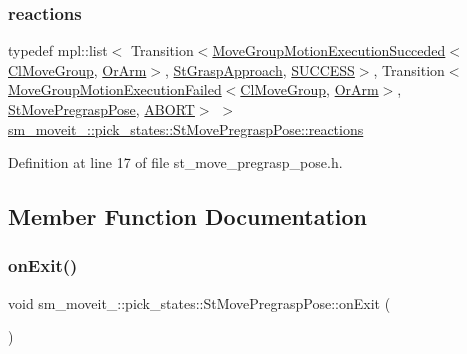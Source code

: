 \subsubsection{\texorpdfstring{reactions}{reactions}}
{\footnotesize\ttfamily typedef mpl\+::list$<$ Transition$<$\hyperlink{structmoveit__z__client_1_1MoveGroupMotionExecutionSucceded}{Move\+Group\+Motion\+Execution\+Succeded}$<$\hyperlink{classmoveit__z__client_1_1ClMoveGroup}{Cl\+Move\+Group}, \hyperlink{classsm__moveit__4_1_1OrArm}{Or\+Arm}$>$, \hyperlink{structsm__moveit__4_1_1pick__states_1_1StGraspApproach}{St\+Grasp\+Approach}, \hyperlink{classSUCCESS}{S\+U\+C\+C\+E\+SS}$>$, Transition$<$\hyperlink{structmoveit__z__client_1_1MoveGroupMotionExecutionFailed}{Move\+Group\+Motion\+Execution\+Failed}$<$\hyperlink{classmoveit__z__client_1_1ClMoveGroup}{Cl\+Move\+Group}, \hyperlink{classsm__moveit__4_1_1OrArm}{Or\+Arm}$>$, \hyperlink{structsm__moveit__4_1_1pick__states_1_1StMovePregraspPose}{St\+Move\+Pregrasp\+Pose}, \hyperlink{classABORT}{A\+B\+O\+RT}$>$ $>$ \hyperlink{structsm__moveit__4_1_1pick__states_1_1StMovePregraspPose_a4329bf7123b5978a7418bda57b17541d}{sm\+\_\+moveit\+\_\+::pick\+\_\+states\+::\+St\+Move\+Pregrasp\+Pose\+::reactions}}



Definition at line 17 of file st\+\_\+move\+\_\+pregrasp\+\_\+pose.\+h.



\subsection{Member Function Documentation}
\mbox{\label{structsm__moveit__4_1_1pick__states_1_1StMovePregraspPose_ae2f50199e1766c1bcdb8fcd25e9a0e16}} 
\subsubsection{\texorpdfstring{on\+Exit()}{onExit()}}
{\footnotesize\ttfamily void sm\+\_\+moveit\+\_\+::pick\+\_\+states\+::\+St\+Move\+Pregrasp\+Pose\+::on\+Exit (\begin{DoxyParamCaption}{ }\end{DoxyParamCaption})\hspace{0.3cm}{\ttfamily [inline]}}



